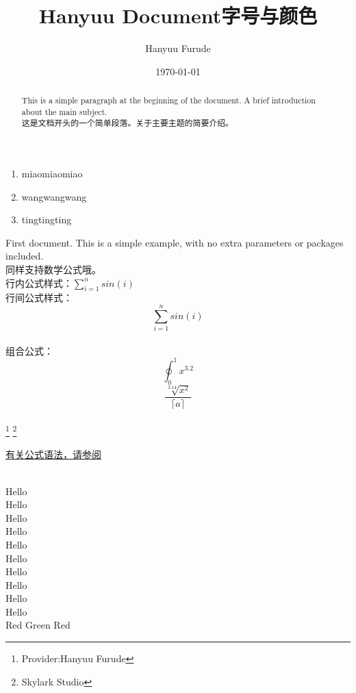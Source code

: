 \documentclass[12pt, a4papper]{ctexart}
\title{Hanyuu Document}
\author{Hanyuu Furude}
\date{\today}
\begin{document}
\begin{titlepage}
\maketitle
\end{titlepage}
\tableofcontents
\begin{enumerate}

	\item miaomiaomiao
	\item wangwangwang
	\item tingtingting
\end{enumerate}
\begin{abstract}
This is a simple paragraph at the beginning of the document. A brief introduction about the main subject.  \\
这是文档开头的一个简单段落。关于主要主题的简要介绍。
\end{abstract}
First document. This is a simple example, with no extra parameters or packages included.\\
同样支持数学公式哦。\\
行内公式样式：$\sum_{i=1}^{n}sin\left(i\right)$\\
行间公式样式：$$\sum_{i=1}^{n}sin\left(i\right)$$\\
组合公式：
\begin{equation}
		\oint_{0}^{1}x^{3.2}
\end{equation}
\begin{equation}
	\frac{\sqrt[3.14]{x^2}}{\lceil a \rceil}
\end{equation}\\
\footnote{Provider:Hanyuu Furude}
\footnote{Skylark Studio}
\begin{center}
\href{https://hanyuufurude.github.io/Others/Latex/}{有关公式语法，请参阅}\\
\end{center}
\newpage
\noindent\title{字号与颜色}\\
{\tiny Hello}\\
{\scriptsize Hello}\\
{\footnotesize Hello}\\
{\small Hello}\\
{\normalsize Hello}\\
{\large Hello}\\
{\Large Hello}\\
{\LARGE Hello}\\
{\huge Hello}\\
{\Huge Hello}\\
\textcolor[RGB]{255,0,0}{Red}
\textcolor[RGB]{0,255,0}{Green}
\textcolor[RGB]{0,0,255}{Red}

\setcounter{page}{2}
\newpage
\begin{comment}
This text won't show up in the compiled pdf this is just a multi-line comment. Useful to, for instance, comment out slow-rendering while working on the draft.
\end{comment}
\end{document}
